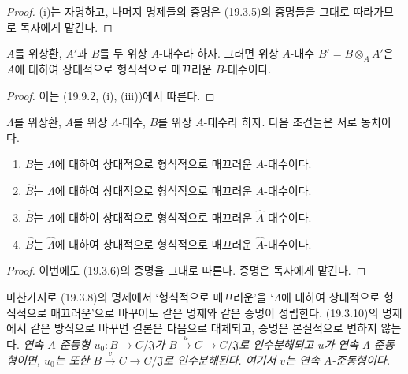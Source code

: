 \begin{proof}
(i)는 자명하고, 나머지 명제들의 증명은 (19.3.5)의 증명들을 그대로
따라가므로 독자에게 맡긴다.
\end{proof}

\begin{corollary}[19.9.3]
\label{0.19.9.3-ko}
$A$를 위상환, $A'$과 $B$를 두 위상 $A$-대수라 하자. 그러면 위상
$A$-대수 $B'=B\otimes_A A'$은 $A$에 대하여 상대적으로 형식적으로
매끄러운 $B$-대수이다.
\end{corollary}

\begin{proof}
이는 (19.9.2, (i), (iii))에서 따른다.
\end{proof}

\begin{proposition}[19.9.4]
\label{0.19.9.4-ko}
$\Lambda$를 위상환, $A$를 위상 $\Lambda$-대수, $B$를 위상
$A$-대수라 하자. 다음 조건들은 서로 동치이다.
\begin{enumerate}
  \item[a)] $B$는 $\Lambda$에 대하여 상대적으로 형식적으로
  매끄러운 $A$-대수이다.
  \item[b)] $\widehat B$는 $\Lambda$에 대하여 상대적으로 형식적으로
  매끄러운 $A$-대수이다.
  \item[c)] $\widehat B$는 $\Lambda$에 대하여 상대적으로 형식적으로
  매끄러운 $\widehat A$-대수이다.
  \item[d)] $\widehat B$는 $\widehat\Lambda$에 대하여 상대적으로
  형식적으로 매끄러운 $\widehat A$-대수이다.
\end{enumerate}
\end{proposition}

\begin{proof}
이번에도 (19.3.6)의 증명을 그대로 따른다. 증명은 독자에게 맡긴다.
\end{proof}


\begin{env}[19.9.5]
\label{0.19.9.5-ko}
마찬가지로 (19.3.8)의 명제에서 ‘형식적으로 매끄러운’을
‘$\Lambda$에 대하여 상대적으로 형식적으로 매끄러운’으로 바꾸어도
같은 명제와 같은 증명이 성립한다. (19.3.10)의 명제에서 같은 방식으로
바꾸면 결론은 다음으로 대체되고, 증명은 본질적으로 변하지 않는다.
\emph{연속 $A$-준동형 $u_0:B\to C/\mathfrak J$가
$B\xrightarrow{u}C\to C/\mathfrak J$로 인수분해되고 $u$가 연속
$\Lambda$-준동형이면, $u_0$는 또한
$B\xrightarrow{v}C\to C/\mathfrak J$로 인수분해된다. 여기서 $v$는
연속 $A$-준동형이다.}
\end{env}

